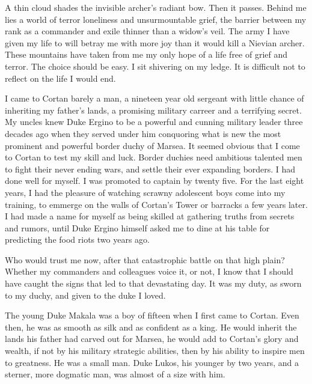 \documentclass{article}
\begin{document}
A thin cloud shades the invisible archer's radiant bow. Then it passes. Behind me lies a world of terror loneliness and unsurmountable grief, the barrier between my rank as a commander and exile thinner than a widow's veil. The army I have given my life to will betray me with more joy than it would kill a Nievian archer. These mountains have taken from me my only hope of a life free of grief and terror. The choice should be easy. I sit shivering on my ledge. It is difficult not to reflect on the life I would end. 

I came to Cortan barely a man, a nineteen year old sergeant with little chance of inheriting my father's lands, a promising military carreer and a terrifying secret. My uncles knew Duke Ergino to be a powerful and cunning military leader three decades ago when they served under him conquoring what is new the most prominent and powerful border duchy of Marsea. It seemed obvious that I come to Cortan to test my skill and luck. Border duchies need ambitious talented men to fight their never ending wars, and settle their ever expanding borders. I had done well for myself. I was promoted to captain by twenty five. For the last eight years, I had the  pleasure of watching scrawny adolescent boys come into my training, to emmerge on the walls of Cortan's Tower or barracks a few years later. I had made a name for myself as being skilled at gathering truths from secrets and rumors, until Duke Ergino himself asked me to dine at his table for predicting the food riots two years ago. 

Who would trust me now, after that catastrophic battle on that high plain? Whether my commanders and colleagues voice it, or not, I know that I should have caught the signs that led to that devastating day. It was my duty, as sworn to my duchy, and given to the duke I loved. 

The young Duke Makala was a boy of fifteen when I first came to Cortan. Even then, he was as smooth as silk and  as confident as a king. He would inherit the lands his father had carved out for Marsea, he would add to Cortan's glory and wealth, if not by his military strategic abilities, then by his ability to inspire men to greatness. He was a small man. Duke Lukos, his younger by two years, and a sterner, more dogmatic man, was almost of a size with him.
\end{document}
